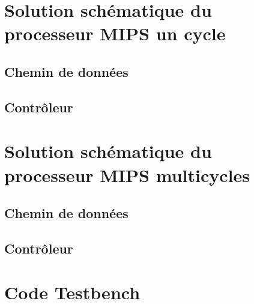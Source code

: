 \documentclass[12pt]{article}
\begin{document}



\section{Solution schématique du processeur MIPS un cycle}
\subsection{Chemin de données}

\pagebreak
\subsection{Contrôleur}

\pagebreak
\section{Solution schématique du processeur MIPS multicycles}
\subsection{Chemin de données}

\pagebreak
\subsection{Contrôleur}

\pagebreak
\section{Code Testbench}
\end{document}
